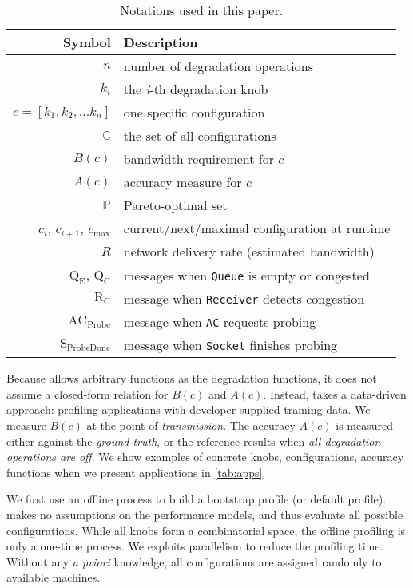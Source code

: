\begin{table}
  \footnotesize
  \centering
  \begin{tabular}{r l}
    \toprule
    \textbf{Symbol} & \textbf{Description} \\
    \midrule
    $n$ & number of degradation operations \\
    $k_i$ & the \textit{i}-th degradation knob \\
    $c = [k_{1}, k_{2}, ... k_{n}]$ & one specific configuration \\
    $\mathbb{C}$ & the set of all configurations \\
    \midrule
    $B(c)$ & bandwidth requirement for $c$ \\
    $A(c)$ & accuracy measure for $c$ \\
    $\mathbb{P}$ & Pareto-optimal set \\
    \midrule
    $c_i$, $c_{i+1}$, $c_{\max}$ & current/next/maximal configuration at runtime \\
    $R$ & network delivery rate (estimated bandwidth) \\
    $\text{Q}_\text{E}$, $\text{Q}_\text{C}$ & messages when \texttt{Queue} is empty or congested \\
    $\text{R}_\text{C}$ & message when \texttt{Receiver} detects congestion \\
    $\text{AC}_\text{Probe}$ & message when \texttt{AC} requests probing \\
    $\text{S}_\text{ProbeDone}$ & message when \texttt{Socket} finishes probing \\
    \bottomrule
  \end{tabular}
  \caption{Notations used in this paper.}
  \label{tab:notations}
\end{table}

Because \sysname{} allows arbitrary functions as the degradation functions, it
does not assume a closed-form relation for $B(c)$ and $A(c)$. Instead,
\sysname{} takes a data-driven approach: profiling applications with
developer-supplied training data.  We measure $B(c)$ at the point of
\textit{transmission}. The accuracy $A(c)$ is measured either against the \textit{ground-truth},
or the reference results when \textit{all degradation operations are off}.  We show
examples of concrete knobs, configurations, accuracy functions when we present
applications in \autoref{tab:apps}.

 We first use an offline process to build a bootstrap
profile (or default profile).  \sysname{} makes no assumptions on the
performance models, and thus evaluate all possible configurations.  While all
knobs form a combinatorial space, the offline profiling is only a one-time
process.  We exploits parallelism to reduce the profiling time.  Without any
\textit{a priori} knowledge, all configurations are assigned randomly to
available machines.

